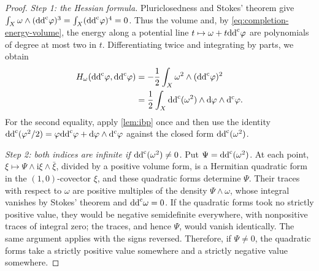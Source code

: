 \begin{proof}
\emph{Step 1: the Hessian formula.} Pluriclosedness and Stokes' theorem give $\int_X\omega\wedge(\mathrm{dd}^{\mathrm{c}}\varphi)^3=\int_X(\mathrm{dd}^{\mathrm{c}}\varphi)^4=0$. Thus the volume and, by \eqref{eq:completion-energy-volume}, the energy along a potential line $t\mapsto\omega+t\mathrm{dd}^{\mathrm{c}}\varphi$ are polynomials of degree at most two in $t$. Differentiating twice and integrating by parts, we obtain
\begin{equation}\label{eq:completion-potential-hessian}
 \begin{aligned}
 H_\omega(\mathrm{dd}^{\mathrm{c}}\varphi,\mathrm{dd}^{\mathrm{c}}\varphi)
 &=-\frac12\int_X\omega^2\wedge(\mathrm{dd}^{\mathrm{c}}\varphi)^2\\
 &=\frac12\int_X\mathrm{dd}^{\mathrm{c}}(\omega^2)\wedge\mathrm d\varphi\wedge\mathrm d^{\mathrm c}\varphi.
 \end{aligned}
\end{equation}
For the second equality, apply \cref{lem:ibp} once and then use the identity $\mathrm{dd}^{\mathrm{c}}(\varphi^2/2)=\varphi\mathrm{dd}^{\mathrm{c}}\varphi+\mathrm d\varphi\wedge\mathrm d^{\mathrm c}\varphi$ against the closed form $\mathrm{dd}^{\mathrm{c}}(\omega^2)$.

\emph{Step 2: both indices are infinite if $\mathrm{dd}^{\mathrm{c}}(\omega^2)\ne0$.} Put $\Psi=\mathrm{dd}^{\mathrm{c}}(\omega^2)$. At each point, $\xi\mapsto\Psi\wedge\mathrm i\xi\wedge\bar\xi$, divided by a positive volume form, is a Hermitian quadratic form in the $(1,0)$-covector $\xi$, and these quadratic forms determine $\Psi$. Their traces with respect to $\omega$ are positive multiples of the density $\Psi\wedge\omega$, whose integral vanishes by Stokes' theorem and $\mathrm{dd}^{\mathrm{c}}\omega=0$. If the quadratic forms took no strictly positive value, they would be negative semidefinite everywhere, with nonpositive traces of integral zero; the traces, and hence $\Psi$, would vanish identically. The same argument applies with the signs reversed. Therefore, if $\Psi\ne0$, the quadratic forms take a strictly positive value somewhere and a strictly negative value somewhere.


\end{proof}
